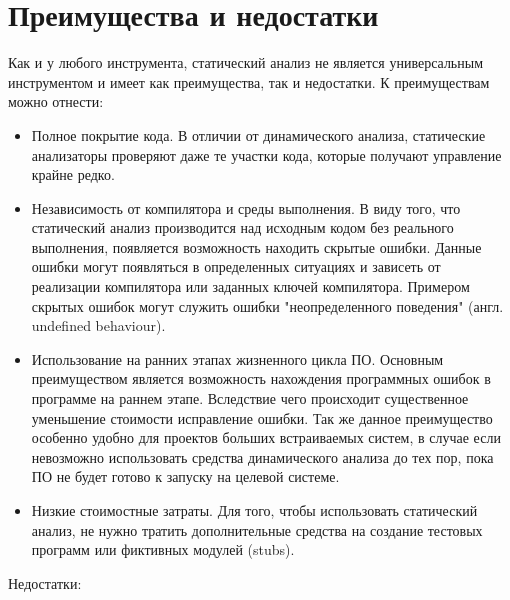 \section{Преимущества и недостатки}
Как и у любого инструмента, статический анализ не является универсальным инструментом и имеет 
как преимущества, так и недостатки.
К преимуществам можно отнести:
\begin{itemize}
	\item Полное покрытие кода. 
	В отличии от динамического анализа, статические анализаторы проверяют даже те участки кода, 
которые получают управление крайне редко.

	\item Независимость от компилятора и среды выполнения.
	В виду того, что статический анализ производится над исходным кодом без реального выполнения,
появляется возможность находить скрытые ошибки. Данные ошибки могут появляться в определенных ситуациях 
и зависеть от реализации компилятора или заданных ключей компилятора. Примером скрытых ошибок могут
служить ошибки "неопределенного поведения" (англ. undefined behaviour).
	
	\item Использование на ранних этапах жизненного цикла ПО.
	Основным преимуществом является возможность нахождения программных ошибок в программе на раннем этапе.
Вследствие чего происходит существенное уменьшение стоимости исправление ошибки. Так же данное 
преимущество особенно удобно для проектов больших встраиваемых систем, в случае если невозможно
использовать средства динамического анализа  до тех пор, пока ПО не будет готово к запуску на целевой системе.

	\item Низкие стоимостные затраты. 
	Для того, чтобы использовать статический анализ, не нужно тратить дополнительные средства 
на создание тестовых программ или фиктивных модулей (stubs).    
\end{itemize}
Недостатки:
